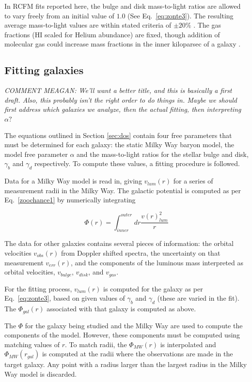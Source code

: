 \documentclass[reprint,%
 amsmath,amssymb,
 aps,
]{revtex4-1}
\begin{document}
 
In RCFM fits reported here, the    bulge and disk mass-to-light ratios are allowed to vary freely from an initial value of $1.0$ (See Eq.~\ref{eq:zonte3}). The resulting average mass-to-light    values are within stated criteria    of $\pm 20\%$ \cite{2016Lelli}. The gas fractions (HI scaled for Helium abundance) are fixed,  though addition of molecular gas could increase mass fractions in the inner kiloparsec of a galaxy   \cite{2004ApJ...609..652M}.

\subsection{Fitting galaxies}
{\color{blue}\emph{COMMENT MEAGAN: We'll want a better title, and this is basically a first draft.  Also, this probably isn't the right order to do things in. Maybe we should first address which galaxies we analyze, then the actual fitting, then interpreting $\alpha?$} }

The equations outlined in Section \ref{sec:dos} contain four free parameters that must be determined for each galaxy: the static Milky Way baryon model, the model free parameter $\alpha$ and the mass-to-light ratios for the stellar bulge and disk, $\gamma_b$ and $\gamma_d$ respectively. To compute these values, a fitting procedure is followed.

Data for a Milky Way model is read in, giving $v_{lum}(r)$ for a series of measurement radii in the Milky Way. The galactic potential is computed as per Eq.~\ref{zoochance1} by numerically integrating

\begin{equation}
\Phi(r) = \int_{inner}^{outer} dr \frac{ 
v(r)^2_{lum} 
}{r}
\end{equation}

The data for other galaxies contains several pieces of information: the orbital velocities $v_{obs}(r)$ from Doppler shifted spectra, the uncertainty on that measurement $v_{err}(r)$, and the components of the luminous mass interpreted as orbital velocities,  $v_{bulge}$, $v_{disk}$, and $v_{gas}$. 

For the fitting process, $v_{lum}(r)$ is computed for the galaxy as per Eq.~\ref{eq:zonte3}, based on given values of $\gamma_b$ and $\gamma_d$ (these are varied in the fit). The $\Phi_{gal}(r)$ associated with that galaxy is computed as above.

The $\Phi$ for the galaxy being studied and the Milky Way are used to compute the components of the model. However, these components must be computed using matching values of $r$. To match radii, the $\Phi_{MW}(r)$ is interpolated and $\Phi_{MW}(r_{gal})$ is computed at the radii where the  observations are made in the target galaxy. Any point with a radius larger than the largest radius in the Milky Way model is discarded.
\end{document}
